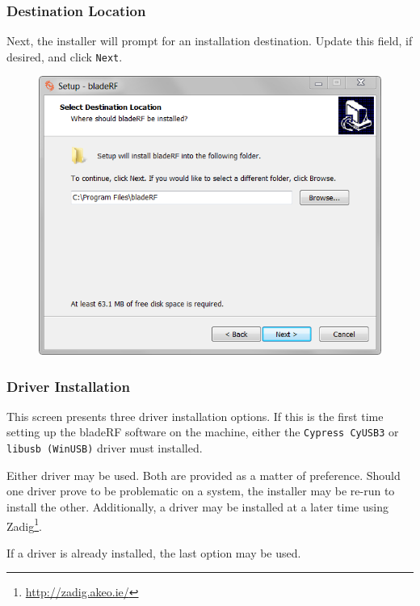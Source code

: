 {\newpage
\subsubsection{Destination Location} \label{sec:dest}
Next, the installer will prompt for an installation destination. Update this field, if desired, and click \texttt{Next}.

\begin{figure}[h]
  \centering
  \includegraphics{images/windows/installer/02-destination.png}
\end{figure}

\newpage
\subsubsection{Driver Installation}

This screen presents three driver installation options. If this is
the first time setting up the bladeRF software on the machine,
either the \texttt{Cypress CyUSB3} or \texttt{libusb (WinUSB)}
driver must installed.

Either driver may be used. Both are provided as a matter of preference.
Should one driver prove to be problematic on a system, the installer
may be re-run to install the other. Additionally, a driver may be
installed at a later time using Zadig\footnote{\url{http://zadig.akeo.ie/}}.

If a driver is already installed, the last option may be used.

}

